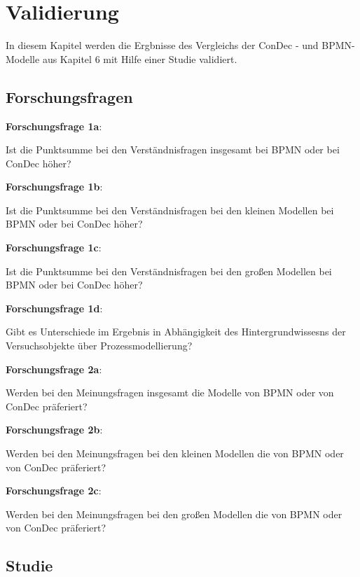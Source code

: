 \chapter{Validierung}\label{sec:chapter7}

In diesem Kapitel werden die Ergbnisse des Vergleichs der ConDec - und BPMN-Modelle aus Kapitel 6 mit Hilfe einer Studie validiert.

\section{Forschungsfragen}

\textbf{Forschungsfrage 1a}: 

Ist die Punktsumme bei den Verständnisfragen insgesamt bei BPMN oder bei ConDec höher?\newline



\textbf{Forschungsfrage 1b}: 

Ist die Punktsumme bei den Verständnisfragen bei den kleinen Modellen bei BPMN oder bei ConDec höher?\newline

\textbf{Forschungsfrage 1c}: 

Ist die Punktsumme bei den Verständnisfragen bei den großen Modellen bei BPMN oder bei ConDec höher? \newline

\textbf{Forschungsfrage 1d}: 

Gibt es Unterschiede im Ergebnis in Abhängigkeit des Hintergrundwissesns der Versuchsobjekte über Prozessmodellierung?  \newline

\textbf{Forschungsfrage 2a}: 

Werden bei den Meinungsfragen insgesamt die Modelle von BPMN oder von ConDec präferiert? \newline

\textbf{Forschungsfrage 2b}: 

Werden bei den Meinungsfragen bei den kleinen Modellen die von BPMN oder von ConDec präferiert?\newline

\textbf{Forschungsfrage 2c}: 

Werden bei den Meinungsfragen bei den großen Modellen die von BPMN oder von ConDec präferiert?\newline

\section{Studie}

